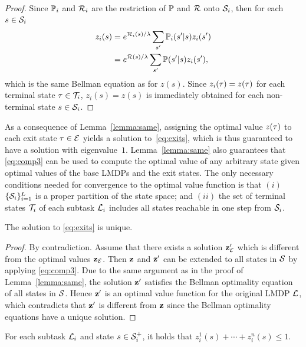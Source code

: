 \begin{proof}
Since $\mathbb{P}_i$ and $\mathcal{R}_i$ are the restriction of $\mathbb{P}$ and $\mathcal{R}$ onto $\mathcal{S}_i$, then for each $s\in\mathcal{S}_i$ 
\begin{align*}
    z_i(s) &= e^{\mathcal{R}_i(s)/\lambda} \sum_{s'}\mathbb{P}_i(s'|s)z_i(s') \\
    &= e^{\mathcal{R}(s)/\lambda} \sum_{s'}\mathbb{P}(s'|s)z_i(s'),
\end{align*}
which is %
 the same Bellman equation as for $z(s)$.
Since $z_i(\tau)=z(\tau)$ for each terminal state $\tau\in\mathcal{T}_i$, $z_i(s)=z(s)$ is immediately obtained for each non-terminal state $s\in\mathcal{S}_i$.
\end{proof}
As a consequence of Lemma~\ref{lemma:same}, assigning the optimal value $z(\tau)$ to each exit state $\tau\in\mathcal{E}$ yields a solution to~\eqref{eq:exits}, which is thus guaranteed to have a solution with eigenvalue~$1$. Lemma~\ref{lemma:same} also guarantees that \eqref{eq:comp3} can be used to compute the optimal value of any arbitrary state given optimal values of the base LMDPs and the exit states. The only necessary conditions needed for convergence to the optimal value function is that $(i)$ $\{\mathcal{S}_i\}_{i=1}^L$ is a proper partition of the state space; and $(ii)$ the set of terminal states $\mathcal{T}_i$ of each subtask $\mathcal{L}_i$ includes all states reachable in one step from $\mathcal{S}_i$.


\begin{lemma}
The solution to \eqref{eq:exits} is unique.
\end{lemma}

\begin{proof}
By contradiction. Assume that there exists a solution ${\bf z}_{\mathcal{E}}'$ which is different from the optimal values ${\bf z}_{\mathcal{E}}$. Then ${\bf z}$ and ${\bf z}'$ can be extended to all states in $\mathcal{S}$ by applying \eqref{eq:comp3}. Due to the same argument as in the proof of Lemma~\ref{lemma:same}, the solution ${\bf z}'$ satisfies the Bellman optimality equation of all states in $\mathcal{S}$. Hence ${\bf z}'$ is an optimal value function for the original LMDP $\mathcal{L}$, which contradicts that ${\bf z}'$ is different from ${\bf z}$ since the Bellman optimality equations have a unique solution.
\end{proof}

\begin{lemma}
For each subtask $\mathcal{L}_i$ and state $s\in\mathcal{S}_i^+$, it holds that $z_i^1(s)+\cdots+z_i^n(s)\leq 1$.
\end{lemma}

